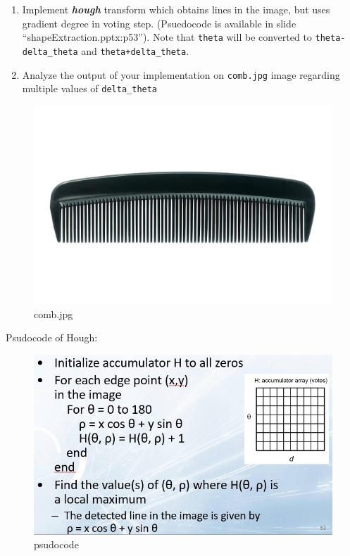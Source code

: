 \documentclass[11pt]{article}
\makeatletter
\def\maxwidth{\ifdim\Gin@nat@width>\linewidth\linewidth
    \else\Gin@nat@width\fi}
\let\Oldincludegraphics\includegraphics
\renewcommand{\includegraphics}[1]{\Oldincludegraphics[width=.8\maxwidth]{#1}}
\providecommand{\tightlist}{%
      \setlength{\itemsep}{0pt}\setlength{\parskip}{0pt}}
\makeatother
\begin{document}
\begin{enumerate}
\def\labelenumi{\arabic{enumi}.}
\tightlist
\item
  Implement \emph{\textbf{hough}} transform which obtains lines in the
  image, but uses gradient degree in voting step. (Psuedocode is
  available in slide ``shapeExtraction.pptx:p53''). Note that
  \texttt{theta} will be converted to \texttt{theta-delta\_theta} and
  \texttt{theta+delta\_theta}.
\item
  Analyze the output of your implementation on \texttt{comb.jpg} image
  regarding multiple values of \texttt{delta\_theta}
\end{enumerate}

\begin{figure}
\centering
\includegraphics{images/comb.jpg}
\caption{comb.jpg}
\end{figure}

Psudocode of Hough:

\begin{figure}
\centering
\includegraphics{wiki/psudo.jpg}
\caption{psudocode}
\end{figure}
\end{document}
